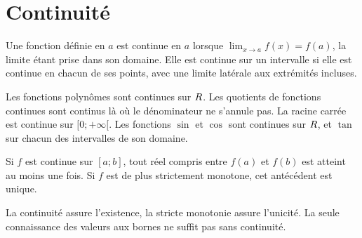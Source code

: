 \section{Continuité}
\begin{definition}Une fonction définie en $a$ est continue en $a$ lorsque $\lim_{x\to a}f(x)=f(a)$, la limite étant prise dans son domaine. Elle est continue sur un intervalle si elle est continue en chacun de ses points, avec une limite latérale aux extrémités incluses.\end{definition}
\begin{propriete}Les fonctions polynômes sont continues sur $R$. Les quotients de fonctions continues sont continus là où le dénominateur ne s’annule pas. La racine carrée est continue sur $[0;+\infty[$. Les fonctions $\sin$ et $\cos$ sont continues sur $R$, et $\tan$ sur chacun des intervalles de son domaine.\end{propriete}
\begin{theoreme}Si $f$ est continue sur $[a;b]$, tout réel compris entre $f(a)$ et $f(b)$ est atteint au moins une fois. Si $f$ est de plus strictement monotone, cet antécédent est unique.\end{theoreme}
La continuité assure l’existence, la stricte monotonie assure l’unicité. La seule connaissance des valeurs aux bornes ne suffit pas sans continuité.


